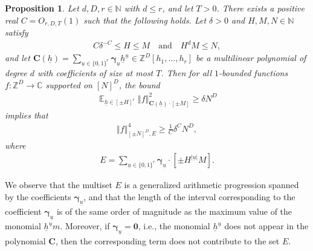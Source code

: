 \documentclass[11pt]{amsart}
\newtheorem{proposition}[lemma]{Proposition}
\theoremstyle{definition}
\DeclareMathOperator*{\E}{\mathbb{E}}
\newcommand{\C}{{\mathbb C}}
\newcommand{\N}{{\mathbb N}}
\newcommand{\Z}{{\mathbb Z}}
\newcommand{\bc}{{\mathbf{C}}}
\newcommand{\bgamma}{{\boldsymbol{\gamma}}}
\newcommand{\uh}{{\underline{h}}}
\newcommand{\uu}{{\underline{u}}}
\newcommand{\norm}[1]{\left\Vert #1\right\Vert}
\begin{document}
\begin{proposition}\label{P: concatenation 1-deg}
    Let $d, D, r\in\N$ with $d\leq r$, and let $T>0$.  There exists %
    a positive real $C=O_{r,D,T}(1)$ such that the following holds.  Let $\delta>0$ and $H,M,N\in\N$ satisfy
    \begin{align}\label{E: conditions in 1-deg concatenation}
        C\delta^{-C} \leq H\leq M \quad \textrm{and}\quad H^d M \leq N,
    \end{align}
    and let $\bc(\uh)= \sum\limits_{\uu\in\{0,1\}^r}\bgamma_\uu \uh^\uu\in\Z^D[h_1, \ldots, h_{r}]$ be a multilinear polynomial of degree $d$ with coefficients of size at most $T$.  Then for all $1$-bounded functions $f:\Z^D\to\C$ supported on $[N]^D$, the bound
    \begin{align}\label{E: lower bound in 1-deg concatenation}
         \E_{\uh\in[\pm H]^r}\norm{f}_{\bc(\uh)\cdot[\pm M]}^2\geq \delta N^D
    \end{align}
    implies that
    \begin{align*}
        \norm{f}_{[\pm N]^D, E}^4\geq \frac{1}{C} \delta^{C}N^D,
    \end{align*}
    where
    \begin{align}\label{E: box E}
        E = \sum_{\uu\in\{0,1\}^r}\bgamma_\uu\cdot[\pm H^{|\uu|}M].
    \end{align}
\end{proposition}
We observe that the multiset $E$ is a generalized arithmetic progression spanned by the coefficients $\bgamma_\uu$, and that the length of the interval corresponding to the coefficient $\bgamma_\uu$ is of the same order of magnitude as the maximum value of the monomial $\uh^\uu m$. Moreover, if $\bgamma_\uu = \textbf{0}$, i.e., the monomial $\uh^\uu$ does not appear in the polynomial $\bc$, then the corresponding term does not contribute to the set $E$.
\end{document}
